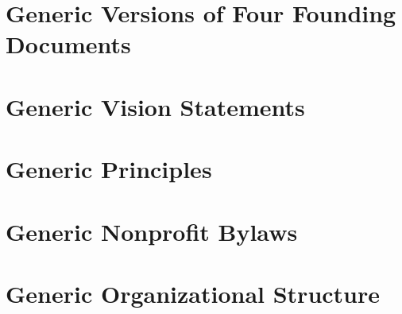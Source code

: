 \chapter*{Generic Versions of Four Founding Documents}


\chapter[Vision Statement]{Generic Vision Statements}


\chapter[Principles]{Generic Principles}


\chapter[Bylaws]{Generic Nonprofit Bylaws}


\chapter[\index{structure}Structure]{Generic Organizational Structure}

